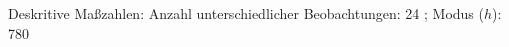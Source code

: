 				\label{tableValues:bvoc05b_g1}
				\vspace*{-\baselineskip}
                    \begin{noten}
                	    \note{} Deskritive Maßzahlen:
                	    Anzahl unterschiedlicher Beobachtungen: 24%
                	    ; 
                	      Modus ($h$): 780
                     \end{noten}


